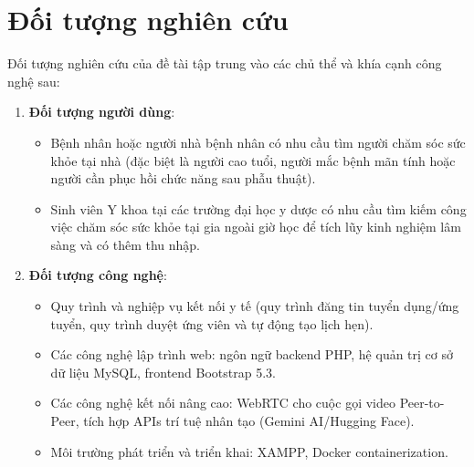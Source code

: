 \documentclass[a4paper,13pt]{extreport}
\begin{document}
\section{Đối tượng nghiên cứu}
Đối tượng nghiên cứu của đề tài tập trung vào các chủ thể và khía cạnh công nghệ sau:
\begin{enumerate}
    \item \textbf{Đối tượng người dùng}:
    \begin{itemize}
        \item Bệnh nhân hoặc người nhà bệnh nhân có nhu cầu tìm người chăm sóc sức khỏe tại nhà (đặc biệt là người cao tuổi, người mắc bệnh mãn tính hoặc người cần phục hồi chức năng sau phẫu thuật).
        \item Sinh viên Y khoa tại các trường đại học y dược có nhu cầu tìm kiếm công việc chăm sóc sức khỏe tại gia ngoài giờ học để tích lũy kinh nghiệm lâm sàng và có thêm thu nhập.
    \end{itemize}
    \item \textbf{Đối tượng công nghệ}:
    \begin{itemize}
        \item Quy trình và nghiệp vụ kết nối y tế (quy trình đăng tin tuyển dụng/ứng tuyển, quy trình duyệt ứng viên và tự động tạo lịch hẹn).
        \item Các công nghệ lập trình web: ngôn ngữ backend PHP, hệ quản trị cơ sở dữ liệu MySQL, frontend Bootstrap 5.3.
        \item Các công nghệ kết nối nâng cao: WebRTC cho cuộc gọi video Peer-to-Peer, tích hợp APIs trí tuệ nhân tạo (Gemini AI/Hugging Face).
        \item Môi trường phát triển và triển khai: XAMPP, Docker containerization.
    \end{itemize}
\end{enumerate}
\end{document}
